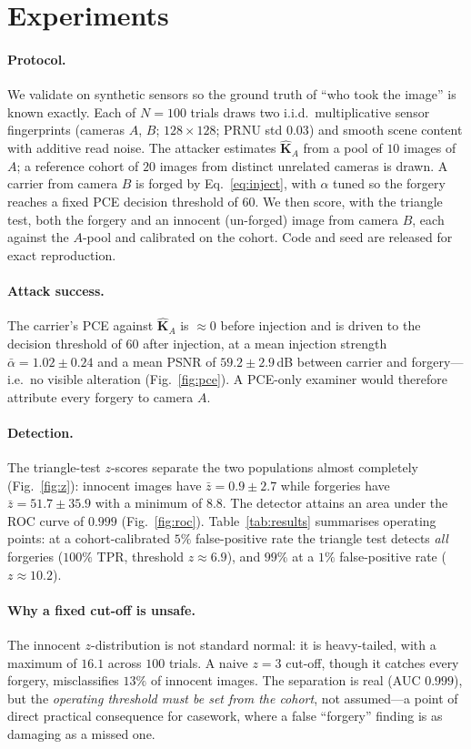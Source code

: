 \documentclass[11pt]{article}
\newcommand{\K}{\mathbf{K}}
\begin{document}
\section{Experiments}
\label{sec:exp}
\paragraph{Protocol.}
We validate on synthetic sensors so the ground truth of ``who took the image'' is
known exactly. Each of $N=100$ trials draws two i.i.d.\ multiplicative sensor
fingerprints (cameras $A$, $B$; $128\times128$; PRNU std $0.03$) and smooth
scene content with additive read noise. The attacker estimates $\hat{\K}_A$ from
a pool of $10$ images of $A$; a reference cohort of $20$ images from distinct
unrelated cameras is drawn. A carrier from camera $B$ is forged by
Eq.~\eqref{eq:inject}, with $\alpha$ tuned so the forgery reaches a fixed PCE
decision threshold of $60$. We then score, with the triangle test, both the
forgery and an innocent (un-forged) image from camera $B$, each against the
$A$-pool and calibrated on the cohort. Code and seed are released for exact
reproduction.

\paragraph{Attack success.}
The carrier's PCE against $\hat{\K}_A$ is $\approx 0$ before injection and is
driven to the decision threshold of $60$ after injection, at a mean injection
strength $\bar\alpha = 1.02\pm0.24$ and a mean PSNR of $59.2\pm2.9$\,dB between
carrier and forgery---i.e.\ no visible alteration (Fig.~\ref{fig:pce}). A
PCE-only examiner would therefore attribute every forgery to camera $A$.

\paragraph{Detection.}
The triangle-test $z$-scores separate the two populations almost completely
(Fig.~\ref{fig:z}): innocent images have $\bar z = 0.9\pm2.7$ while forgeries
have $\bar z = 51.7\pm35.9$ with a minimum of $8.8$. The detector attains an area
under the ROC curve of $0.999$ (Fig.~\ref{fig:roc}). Table~\ref{tab:results}
summarises operating points: at a cohort-calibrated $5\%$ false-positive rate the
triangle test detects \emph{all} forgeries ($100\%$ TPR, threshold $z\approx6.9$),
and $99\%$ at a $1\%$ false-positive rate ($z\approx10.2$).

\paragraph{Why a fixed cut-off is unsafe.}
The innocent $z$-distribution is not standard normal: it is heavy-tailed, with a
maximum of $16.1$ across $100$ trials. A naive $z=3$ cut-off, though it catches
every forgery, misclassifies $13\%$ of innocent images. The separation is real
(AUC $0.999$), but the \emph{operating threshold must be set from the cohort},
not assumed---a point of direct practical consequence for casework, where a
false ``forgery'' finding is as damaging as a missed one.
\end{document}
